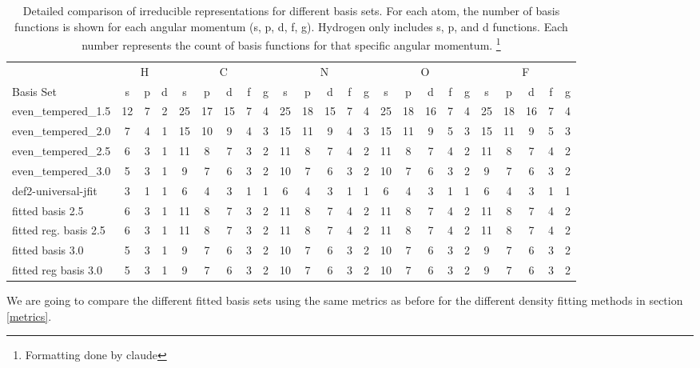 \begin{table}
\centering
\tiny
\begin{tabular}{|l|ccc|ccccc|ccccc|ccccc|ccccc|}
\hline
& \multicolumn{3}{c|}{H} & \multicolumn{5}{c|}{C} & \multicolumn{5}{c|}{N} & \multicolumn{5}{c|}{O} & \multicolumn{5}{c|}{F} \\
Basis Set & s & p & d & s & p & d & f & g & s & p & d & f & g & s & p & d & f & g & s & p & d & f & g \\
\hline
even\_tempered\_1.5 & 12 & 7 & 2 & 25 & 17 & 15 & 7 & 4 & 25 & 18 & 15 & 7 & 4 & 25 & 18 & 16 & 7 & 4 & 25 & 18 & 16 & 7 & 4 \\
even\_tempered\_2.0 & 7 & 4 & 1 & 15 & 10 & 9 & 4 & 3 & 15 & 11 & 9 & 4 & 3 & 15 & 11 & 9 & 5 & 3 & 15 & 11 & 9 & 5 & 3 \\
even\_tempered\_2.5 & 6 & 3 & 1 & 11 & 8 & 7 & 3 & 2 & 11 & 8 & 7 & 4 & 2 & 11 & 8 & 7 & 4 & 2 & 11 & 8 & 7 & 4 & 2 \\
even\_tempered\_3.0 & 5 & 3 & 1 & 9 & 7 & 6 & 3 & 2 & 10 & 7 & 6 & 3 & 2 & 10 & 7 & 6 & 3 & 2 & 9 & 7 & 6 & 3 & 2 \\
def2-universal-jfit & 3 & 1 & 1 & 6 & 4 & 3 & 1 & 1 & 6 & 4 & 3 & 1 & 1 & 6 & 4 & 3 & 1 & 1 & 6 & 4 & 3 & 1 & 1 \\
fitted basis 2.5 & 6 & 3 & 1 & 11 & 8 & 7 & 3 & 2 & 11 & 8 & 7 & 4 & 2 & 11 & 8 & 7 & 4 & 2 & 11 & 8 & 7 & 4 & 2 \\
fitted reg. basis 2.5 & 6 & 3 & 1 & 11 & 8 & 7 & 3 & 2 & 11 & 8 & 7 & 4 & 2 & 11 & 8 & 7 & 4 & 2 & 11 & 8 & 7 & 4 & 2 \\
fitted basis 3.0 & 5 & 3 & 1 & 9 & 7 & 6 & 3 & 2 & 10 & 7 & 6 & 3 & 2 & 10 & 7 & 6 & 3 & 2 & 9 & 7 & 6 & 3 & 2 \\
fitted reg basis 3.0 & 5 & 3 & 1 & 9 & 7 & 6 & 3 & 2 & 10 & 7 & 6 & 3 & 2 & 10 & 7 & 6 & 3 & 2 & 9 & 7 & 6 & 3 & 2 \\
\hline
\end{tabular}
\caption{Detailed comparison of irreducible representations for different basis sets. For each atom, the number of basis functions is shown for each angular momentum (s, p, d, f, g). Hydrogen only includes s, p, and d functions. Each number represents the count of basis functions for that specific angular momentum. \footnote{Formatting done by claude}}
\label{tab:basis-comparison-detailed}
\end{table}

We are going to compare the different fitted basis sets using the same metrics as before for the different density fitting methods in section \ref{metrics}.


